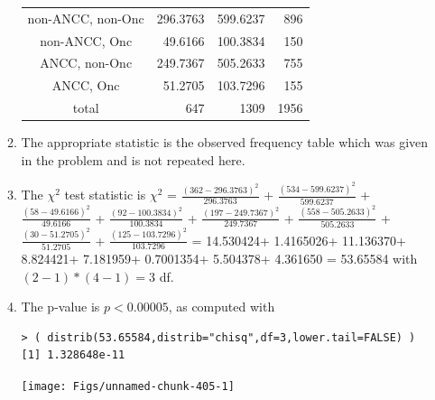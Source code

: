\documentclass[10pt,openany]{book}\usepackage[]{graphicx}\usepackage[]{color}
\makeatletter
\newenvironment{kframe}{%
 \def\at@end@of@kframe{}%
 \ifinner\ifhmode%
  \def\at@end@of@kframe{\end{minipage}}%
  \begin{minipage}{\columnwidth}%
 \fi\fi%
 \def\FrameCommand##1{\hskip\@totalleftmargin \hskip-\fboxsep
 \colorbox{shadecolor}{##1}\hskip-\fboxsep
     \hskip-\linewidth \hskip-\@totalleftmargin \hskip\columnwidth}%
 \MakeFramed {\advance\hsize-\width
   \@totalleftmargin\z@ \linewidth\hsize
   \@setminipage}}%
 {\par\unskip\endMakeFramed%
 \at@end@of@kframe}
\newenvironment{knitrout}{}{} %
\makeatother
\begin{document}
\begin{itemize}
\begin{enumerate}
\begin{center}
\begin{tabular}{c|rr|r}
            \hline
            non-ANCC, non-Onc & 296.3763 & 599.6237 & 896 \\
            non-ANCC, Onc     &  49.6166 & 100.3834  & 150 \\
            ANCC, non-Onc     & 249.7367 & 505.2633 & 755 \\
            ANCC, Onc         &  51.2705 & 103.7296 & 155 \\
            \hline
            total & 647 & 1309 & 1956 \\
            \hline\hline
          \end{tabular}
        \end{center}
      \item The appropriate statistic is the observed frequency table which was given in the problem and is not repeated here.
      \item The $\chi^{2}$ test statistic is $\chi^{2}$ = $\frac{(362-296.3763)^{2}}{296.3763}$ + $\frac{(534-599.6237)^{2}}{599.6237}$ + $\frac{(58-49.6166)^{2}}{49.6166}$ + $\frac{(92-100.3834)^{2}}{100.3834}$ + $\frac{(197-249.7367)^{2}}{249.7367}$ + $\frac{(558-505.2633)^{2}}{505.2633}$ + $\frac{(30-51.2705)^{2}}{51.2705}$ + $\frac{(125-103.7296)^{2}}{103.7296}$ = 14.530424+ 1.4165026+ 11.136370+ 8.824421+ 7.181959+ 0.7001354+ 5.504378+ 4.361650 = 53.65584 with $(2-1)*(4-1)=3$ df.
      \item The p-value is $p<0.00005$, as computed with
\begin{knitrout}
\color{fgcolor}\begin{kframe}
\begin{verbatim}
> ( distrib(53.65584,distrib="chisq",df=3,lower.tail=FALSE) )
[1] 1.328648e-11
\end{verbatim}
\end{kframe}

{\centering \texttt{[image: Figs/unnamed-chunk-405-1]} 

}




\end{knitrout}
\end{enumerate}
\end{itemize}
\end{document}
